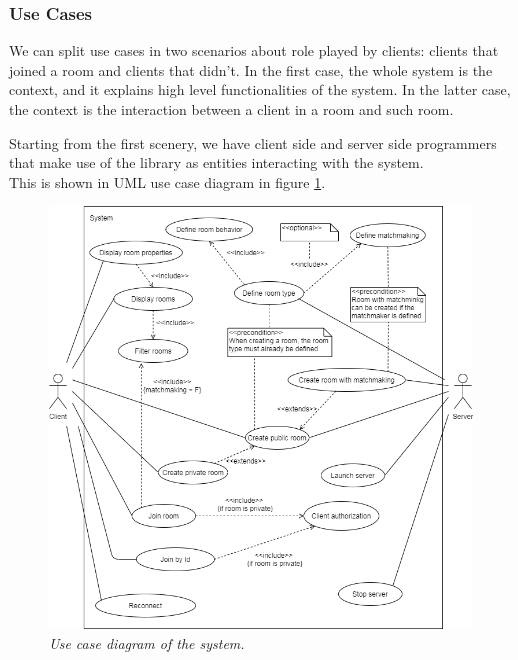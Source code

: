 \subsubsection{Use Cases}

We can split use cases in two scenarios about role played by clients: clients that joined a room and clients that didn't. In the first case, the whole system is the context, and it explains high level functionalities of the system. In the latter case, the context is the interaction between a client in a room and such room.

\bigskip
Starting from the first scenery, we have client side and server side programmers that make use of the library as entities interacting with the system.
\\
This is shown in UML use case diagram in figure \ref{fig:system-use_cases}.
\begin{figure}[H]
  \includegraphics[scale=0.5]{images/2-scoping/system-use_cases.png}
   \centering  
   \caption{\textit{Use case diagram of the system.}}
  \label{fig:system-use_cases}
\end{figure}

